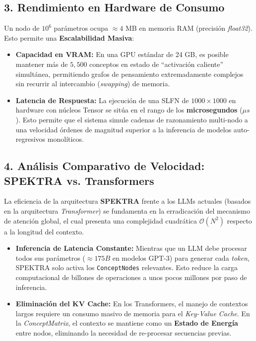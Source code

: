 \documentclass[12pt]{article}
\begin{document}
\subsection{3. Rendimiento en Hardware de Consumo}
Un nodo de $10^6$ parámetros ocupa $\approx 4$ MB en memoria RAM (precisión \textit{float32}). Esto permite una \textbf{Escalabilidad Masiva}:
\begin{itemize}
	\item \textbf{Capacidad en VRAM:} En una GPU estándar de 24 GB, es posible mantener más de $5,500$ conceptos en estado de ``activación caliente'' simultánea, permitiendo grafos de pensamiento extremadamente complejos sin recurrir al intercambio (\textit{swapping}) de memoria.
	\item \textbf{Latencia de Respuesta:} La ejecución de una SLFN de $1000 \times 1000$ en hardware con núcleos Tensor se sitúa en el rango de los \textbf{microsegundos} ($\mu s$). Esto permite que el sistema simule cadenas de razonamiento multi-nodo a una velocidad órdenes de magnitud superior a la inferencia de modelos auto-regresivos monolíticos.
\end{itemize}

\subsection{4. Análisis Comparativo de Velocidad: SPEKTRA vs. Transformers}

La eficiencia de la arquitectura \textbf{SPEKTRA} frente a los LLMs actuales (basados en la arquitectura \textit{Transformer}) se fundamenta en la erradicación del mecanismo de atención global, el cual presenta una complejidad cuadrática $\mathcal{O}(N^2)$ respecto a la longitud del contexto.

\begin{itemize}
	\item \textbf{Inferencia de Latencia Constante:} Mientras que un LLM debe procesar todos sus parámetros ($\approx 175B$ en modelos GPT-3) para generar cada \textit{token}, SPEKTRA solo activa los \texttt{ConceptNodes} relevantes. Esto reduce la carga computacional de billones de operaciones a unos pocos millones por paso de inferencia.
	\item \textbf{Eliminación del KV Cache:} En los Transformers, el manejo de contextos largos requiere un consumo masivo de memoria para el \textit{Key-Value Cache}. En la \textit{ConceptMatrix}, el contexto se mantiene como un \textbf{Estado de Energía} entre nodos, eliminando la necesidad de re-procesar secuencias previas.
\end{itemize}
\end{document}
